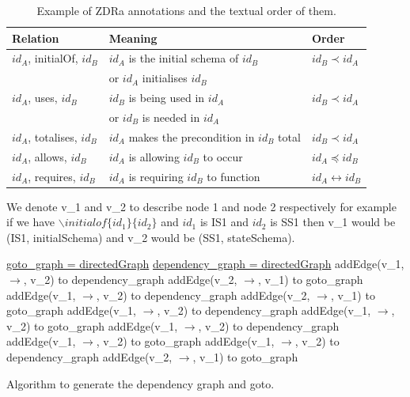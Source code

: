 \begin{table}[H]
\centering
\begin{tabular}{| l | l | l |}
\hline
\textbf{Relation} & \textbf{Meaning} & \textbf{Order} \\
\hline 
$id_{A}$, initialOf, $id_{B}$ & $id_{A}$ is the initial schema of $id_{B}$ & $id_{B} \prec id_{A}$ \\
 & or $id_{A}$ initialises $id_{B}$ & \\
 \hline
$id_{A}$, uses, $id_{B}$ & $id_{B}$ is being used in $id_{A}$ & $id_{B} \prec id_{A}$ \\
& or $id_{B}$ is needed in $id_{A}$ & \\
 \hline
 $id_{A}$, totalises, $id_{B}$ & $id_{A}$ makes the precondition in $id_{B}$ total & $id_{B} \prec id_{A}$ \\
 \hline
$id_{A}$, allows, $id_{B}$ & $id_{A}$ is allowing $id_{B}$ to occur & $id_{A} \preceq id_{B}$ \\
\hline
$id_{A}$, requires, $id_{B}$ & $id_{A}$ is requiring $id_{B}$ to function & $id_{A} \leftrightarrow id_{B}$ \\
\hline
\end{tabular}
\caption{Example of ZDRa annotations and the textual order of them. \label{tab:texorder}}
\end{table}

\begin{defin}
We denote v\_1 and v\_2 to describe node 1 and node 2 respectively for example if we have $\backslash initialof\{id_{1}\}\{id_{2}\}$ and $id_{1}$ is IS1 and $id_{2}$ is SS1 then v\_1 would be (IS1, initialSchema) and v\_2 would be (SS1, stateSchema).
\end{defin}

\begin{algorithm}[H]
\underline{goto\_graph = directedGraph} \;
\underline{dependency\_graph = directedGraph} \;
\SetAlgoLined
{} 
{
addEdge(v\_1, $\rightarrow$, v\_2) to dependency\_graph \;
addEdge(v\_2, $\rightarrow$, v\_1)  to goto\_graph\;
}
{
addEdge(v\_1, $\rightarrow$, v\_2) to dependency\_graph \;
addEdge(v\_2, $\rightarrow$, v\_1)  to goto\_graph \;
}
{
addEdge(v\_1, $\rightarrow$, v\_2) to dependency\_graph \;
addEdge(v\_1, $\rightarrow$, v\_2)  to goto\_graph \;
}
{
addEdge(v\_1, $\rightarrow$, v\_2) to dependency\_graph \;
addEdge(v\_1, $\rightarrow$, v\_2)  to goto\_graph \;
}
{
addEdge(v\_1, $\rightarrow$, v\_2) to dependency\_graph \;
addEdge(v\_2, $\rightarrow$, v\_1)  to goto\_graph \;
}
\caption{Algorithm to generate the dependency graph and goto. \label{alg:gotodep} }
\end{algorithm}
\vspace{0.2in}


